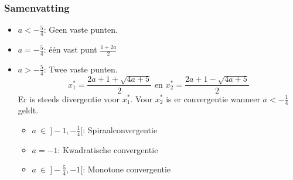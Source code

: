 \documentclass[examenvragen.tex]{subfiles}
\begin{document}
\subsubsection{Samenvatting}
\begin{itemize}
\item $a < -\frac{5}{4}$: Geen vaste punten.
\item $a = -\frac{5}{4}$: \'e\'en vast punt $\frac{1+2a}{2}$
\item $a > -\frac{5}{4}$: Twee vaste punten.
\[
x^{*}_1 = \frac{2a+1 +\sqrt{4a+5}}{2} \text{ en } x^{*}_{2}= \frac{2a+1 -\sqrt{4a+5}}{2}
\]
Er is steeds divergentie voor $x^{*}_1$. 
Voor $x^{*}_{2}$ is er convergentie wanneer $a< -\frac{1}{4}$ geldt.
\begin{itemize}
\item $a \ \in\  ]-1,-\frac{1}{4}[$: Spiraalconvergentie
\item $a=-1$: Kwadratische convergentie
\item $a\ \in\ ]-\frac{5}{4},-1[$: Monotone convergentie
\end{itemize} 
\end{itemize}
\end{document}
